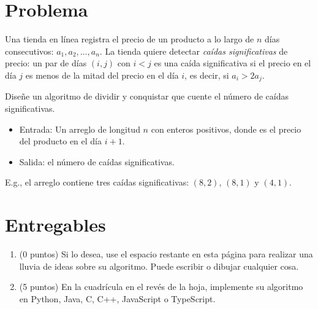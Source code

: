 \section{Problema}
Una tienda en línea registra el precio de un producto a lo largo de $n$ días consecutivos: $a_1, a_2, \ldots, a_n$. La tienda quiere detectar \emph{caídas significativas} de precio: un par de días $(i, j)$ con $i < j$ es una caída significativa si el precio en el día $j$ es menos de la mitad del precio en el día $i$, es decir, si $a_i > 2 a_j$.

Diseñe un algoritmo de dividir y conquistar que cuente el número de caídas significativas.
\begin{itemize}
  \item Entrada: Un arreglo  de longitud $n$ con enteros positivos, donde  es el precio del producto en el día $i+1$.
  \item Salida: el número de caídas significativas.
\end{itemize}

E.g., el arreglo \inline{[8, 4, 2, 1]} contiene tres caídas significativas: \((8,2)\), \((8,1)\) y \((4,1)\).

\section{Entregables}

\begin{enumerate}
  \item (0 puntos) Si lo desea, use el espacio restante en esta página para realizar una lluvia de ideas sobre su algoritmo. Puede escribir o dibujar cualquier cosa.
  \item (5 puntos) En la cuadrícula en el revés de la hoja, implemente su algoritmo en Python, Java, C, C++, JavaScript o TypeScript.
\end{enumerate}
